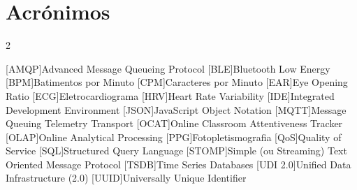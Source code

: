 \chapter{Acrónimos}

\footnotesize
\SingleSpacing
\begin{multicols}{2}
\begin{acronym}[AAAAAA] %
	[AMQP]{Advanced Message Queueing Protocol}
	[BLE]{Bluetooth Low Energy}
	[BPM]{Batimentos por Minuto}
	[CPM]{Caracteres por Minuto}
	[EAR]{Eye Opening Ratio}
	[ECG]{Eletrocardiograma}
	[HRV]{Heart Rate Variability}
	[IDE]{Integrated Development Environment}
	[JSON]{JavaScript Object Notation}
	[MQTT]{Message Queuing Telemetry Transport}
	[OCAT]{Online Classroom Attentiveness Tracker}
	[OLAP]{Online Analytical Processing}
	[PPG]{Fotopletismografia}
	[QoS]{Quality of Service}
	[SQL]{Structured Query Language}
	[STOMP]{Simple (ou Streaming) Text Oriented Message Protocol}
	[TSDB]{Time Series Databases}
	[UDI 2.0]{Unified Data Infrastructure (2.0)}
	[UUID]{Universally Unique Identifier}
\end{acronym}
\end{multicols}

